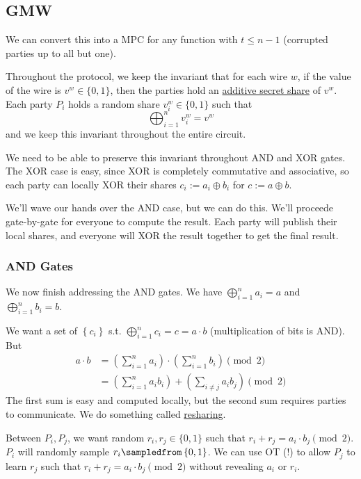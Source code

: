 \subsection{GMW} \label{sec:mar23-gmw}

We can convert this into a MPC for any function with $t \leq n - 1$ (corrupted parties up to all but one).

Throughout the protocol, we keep the invariant that for each wire $w$, if the value of the wire is $v^w \in\{0, 1\}$, then the parties hold an \ul{additive secret share} of $v^w$. Each party $P_i$ holds a random share $v_i^w\in\{0,1\}$ such that
\[\bigoplus_{i=1}^n v_i^w = v^w\]
and we keep this invariant throughout the entire circuit.

We need to be able to preserve this invariant throughout \textsf{AND} and \textsf{XOR} gates. The \textsf{XOR} case is easy, since \textsf{XOR} is completely commutative and associative, so each party can locally \textsf{XOR} their shares $c_i := a_i\oplus b_i$ for $c := a\oplus b$.

We'll wave our hands over the \textsf{AND} case, but we can do this. We'll proceede gate-by-gate for everyone to compute the result. Each party will publish their local shares, and everyone will \textsf{XOR} the result together to get the final result.

\subsubsection{AND Gates}
We now finish addressing the \textsf{AND} gates. We have $\bigoplus^n_{i=1}a_i = a$ and $\bigoplus^n_{i=1}b_i = b$.

We want a set of $\left\{ c_i \right\}$ s.t. $\bigoplus^n_{i=1}c_i = c = a \cdot b$ (multiplication of bits is \textsf{AND}). But
\begin{align*}
    a\cdot b
     & = \left( \sum^n_{i=1}a_i \right)\cdot \left( \sum^n_{i=1}b_i \right)\pmod{2}                \\
     & = \left( \sum^n_{i=1}a_i b_i \right) + \left( \sum_{i\neq j}a_i b_j \right)\pmod{2}
\end{align*}
The first sum is easy and computed locally, but the second sum requires parties to communicate. We do something called \ul{resharing}.


Between $P_i, P_j$, we want random $r_i, r_j\in\{0, 1\}$ such that $r_i + r_j = a_i \cdot b_j \pmod{2}$. $P_i$ will randomly sample $r_i\sampledfrom \left\{ 0, 1 \right\}$. We can use OT (!) to allow $P_j$ to learn $r_j$ such that $r_i + r_j = a_i\cdot b_j\pmod{2}$ without revealing $a_i$ or $r_i$.

